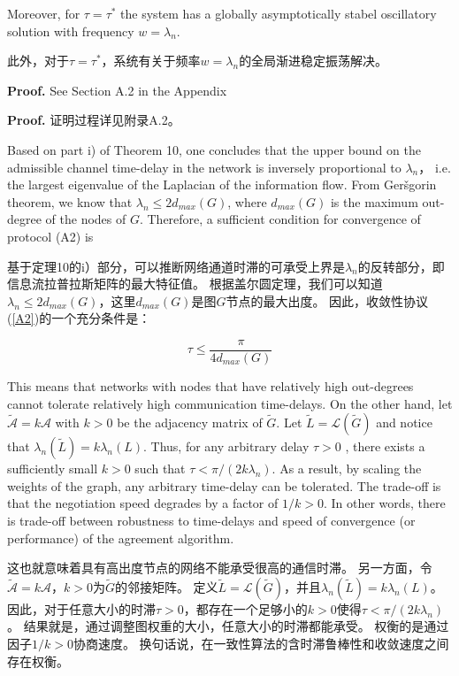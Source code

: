 \documentclass{article}
\begin{document}
{\color[gray]{0.5}
\noindent Moreover, for $\tau=\tau^*$ the system has a globally asymptotically stabel oscillatory solution with frequency $w=\lambda_n$. 
}

\noindent 此外，对于$\tau=\tau^*$，系统有关于频率$w=\lambda_n$的全局渐进稳定振荡解决。

{\color[gray]{0.5}
\noindent \textbf{Proof.} See Section A.2 in the Appendix
}

\noindent \textbf{Proof.} 证明过程详见附录A.2。

{\color[gray]{0.5}
Based on part i) of Theorem 10, one concludes that the upper bound on the admissible channel time-delay in the network is inversely proportional to $\lambda_n$， i.e. the largest eigenvalue of the Laplacian of the information flow. 
From Ger\v sgorin theorem, we know that $\lambda_n\le 2d_{max}(G)$, where $d_{max}(G)$ is the maximum out-degree of the nodes of $G$. 
Therefore, a sufficient condition for convergence of protocol (A2) is 
}

基于定理10的i）部分，可以推断网络通道时滞的可承受上界是$\lambda_n$的反转部分，即信息流拉普拉斯矩阵的最大特征值。
根据盖尔圆定理，我们可以知道$\lambda_n\le 2d_{max}(G)$，这里$d_{max}(G)$是图$G$节点的最大出度。
因此，收敛性协议(\ref{A2})的一个充分条件是：

\begin{equation}
    \tau \le \frac{\pi}{4d_{max}(G)}
    \tag{40}
    \label{40}
\end{equation}

{\color[gray]{0.5}
\noindent This means that networks with nodes that have relatively high out-degrees cannot tolerate relatively high communication time-delays. 
On the other hand, let $\tilde{\mathcal{A}}=k\mathcal{A}$ with $k>0$ be the adjacency matrix of $\tilde{G}$. 
Let $\tilde{L}=\mathcal{L}(\tilde{G})$ and notice that $\lambda_n(\tilde{L}) = k\lambda_n(L)$. 
Thus, for any arbitrary delay $\tau>0$ , there exists a sufficiently small $k>0$ such that $\tau < \pi/(2k\lambda_n)$. 
As a result, by scaling the weights of the graph, any arbitrary time-delay can be tolerated. 
The trade-off is that the negotiation speed degrades by a factor of $1/k>0$. 
In other words, there is trade-off between robustness to time-delays and speed of convergence (or performance) of the agreement algorithm. 
}

\noindent 这也就意味着具有高出度节点的网络不能承受很高的通信时滞。
另一方面，令$\tilde{\mathcal{A}}=k\mathcal{A}$，$k>0$为$\tilde{G}$的邻接矩阵。
定义$\tilde{L}=\mathcal{L}(\tilde{G})$，并且$\lambda_n(\tilde{L}) = k\lambda_n(L)$。
因此，对于任意大小的时滞$\tau>0$，都存在一个足够小的$k>0$使得$\tau < \pi/(2k\lambda_n)$。
结果就是，通过调整图权重的大小，任意大小的时滞都能承受。
权衡的是通过因子$1/k>0$协商速度。
换句话说，在一致性算法的含时滞鲁棒性和收敛速度之间存在权衡。
\end{document}
